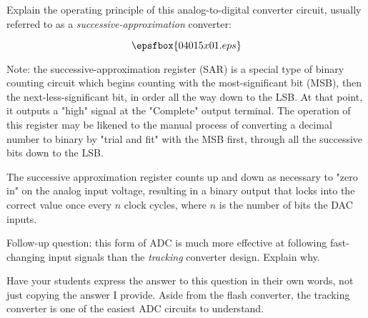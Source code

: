 

Explain the operating principle of this analog-to-digital converter circuit, usually referred to as a {\it successive-approximation} converter:

$$\epsfbox{04015x01.eps}$$

Note: the successive-approximation register (SAR) is a special type of binary counting circuit which begins counting with the most-significant bit (MSB), then the next-less-significant bit, in order all the way down to the LSB.  At that point, it outputs a "high" signal at the "Complete" output terminal.  The operation of this register may be likened to the manual process of converting a decimal number to binary by "trial and fit" with the MSB first, through all the successive bits down to the LSB.







The successive approximation register counts up and down as necessary to "zero in" on the analog input voltage, resulting in a binary output that locks into the correct value once every $n$ clock cycles, where $n$ is the number of bits the DAC inputs.

\vskip 10pt

Follow-up question: this form of ADC is much more effective at following fast-changing input signals than the {\it tracking} converter design.  Explain why.







Have your students express the answer to this question in their own words, not just copying the answer I provide.  Aside from the flash converter, the tracking converter is one of the easiest ADC circuits to understand. 




